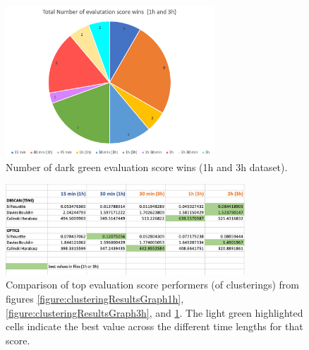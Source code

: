 

\begin{figure}
  \centering
  \includegraphics[width=0.7\textwidth]{./images/clusteringResults/clusteringResultsGraphTotal.png}
  \caption{Number of dark green evaluation score wins (1h and 3h dataset).}
  \label{figure:clusteringResultsGraphTotal}
\end{figure}









\begin{figure}
  \centering
  \includegraphics[width=0.8\textwidth]{./images/clusteringResults/clusteringResults8.png}
  \caption{Comparison of top evaluation score performers (of clusterings) from figures \ref{figure:clusteringResultsGraph1h}, \ref{figure:clusteringResultsGraph3h}, and \ref{figure:clusteringResultsGraphTotal}. The light green highlighted cells indicate the best value across the different time lengths for that score.}
  \label{figure:clusteringResults8}
\end{figure}

\clearpage
